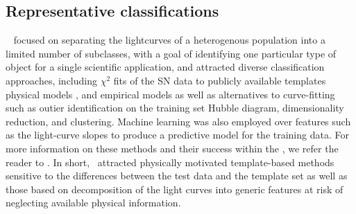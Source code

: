 %

\subsection{Representative classifications}
\label{sec:realdata}

\snphotcc\ \citep{kessler_supernova_2010} focused on separating the lightcurves of a heterogenous population into a limited number of subclasses, with a goal of identifying one particular type of object for a single scientific application, and attracted diverse classification approaches, including $\chi^{2}$ fits of the SN data to publicly available templates \citep{2002PASP..114..803N} physical models \citep{2008ApJ...681..482C}, and empirical models as well as alternatives to curve-fitting such as
outier identification on the training set Hubble diagram, dimensionality reduction,
and clustering.
Machine learning was also employed over features such as the light-curve slopes to produce a predictive model for the training data.
For more information on these methods and their success within the \snphotcc, we refer the reader to \cite{kessler_results_2010}.
In short, \snphotcc\ attracted physically motivated template-based methods sensitive to the differences between the test data and the template set
as well as those based on decomposition of the light curves into generic features at risk of neglecting available physical information.


